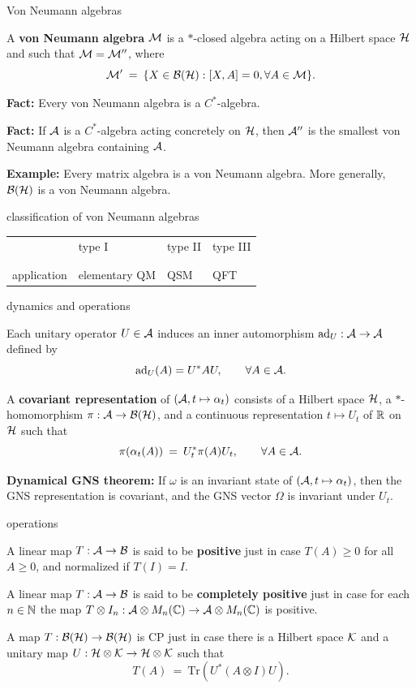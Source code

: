 \documentclass[8pt]{beamer}
\begin{document}
\begin{frame}{Von Neumann algebras}

A \textbf{von Neumann algebra} $\mathcal M$ is a $*$-closed algebra acting on a Hilbert space $\mathcal H$ and such that $\mathcal M = \mathcal M ''$, where 
$$ \mathcal M ' \: = \: \{ X \in \mathcal B (\mathcal H ) : [X,A]=0, \forall A\in \mathcal M \} .$$

\bigskip \textbf{Fact:} Every von Neumann algebra is a $C^*$-algebra.

\bigskip \textbf{Fact:} If $\mathcal A$ is a $C^*$-algebra acting concretely
on $\mathcal H$, then $\mathcal A ''$ is the smallest von Neumann algebra containing
$\mathcal A$.

\bigskip \textbf{Example:} Every matrix algebra is a von Neumann
algebra.  More generally, $\mathcal B (\mathcal H )$ is a von Neumann algebra.
\end{frame}

\begin{frame}{classification of von Neumann algebras}

\begin{tabularx}{\textwidth}{XXXX}
& type I & type II & type III \\ \\ 
\hline \\ 
application & elementary QM & QSM  & QFT
\end{tabularx}

\end{frame}


\begin{frame}{dynamics and operations}

  Each unitary operator $U\in \mathcal A$ induces an inner automorphism
  $\mathrm{ad}_U:\mathcal A\to\mathcal A$ defined by
$$ \mathrm{ad}_U(A) = U^*AU,\qquad \forall A\in \mathcal A .$$

\bigskip A \textbf{covariant representation} of $(\mathcal A ,t\mapsto \alpha
_t)$ consists of a Hilbert space $\mathcal H$, a $*$-homomorphism $\pi:\mathcal A\to\mathcal B (\mathcal H )$, and a continuous representation $t\mapsto U_t$ of $\mathbb R$ on $\mathcal H$ such that 
$$ \pi (\alpha _t(A)) \: =\: U^*_t\pi (A)U_t ,\qquad \forall A\in \mathcal A .$$

\bigskip \textbf{Dynamical GNS theorem:} If $\omega$ is an invariant
state of $(\mathcal A ,t\mapsto \alpha _t)$, then the GNS representation is
covariant, and the GNS vector $\Omega$ is invariant under $U_t$.

\end{frame}
\begin{frame}{operations}

  A linear map $T:\mathcal A\to\mathcal B$ is said to be \textbf{positive} just in
  case $T(A)\geq 0$ for all $A\geq 0$, and normalized if $T(I)=I$.

  \bigskip A linear map $T:\mathcal A\to\mathcal B$ is said to be \textbf{completely
    positive} just in case for each $n\in\mathbb N$ the map
  $T\otimes I_n:\mathcal A\otimes M_n(\mathbb C )\to\mathcal A\otimes M_n(\mathbb C )$ is
  positive.

\bigskip A map $T:\mathcal B (\mathcal H )\to \mathcal B (\mathcal H )$ is CP just in case there is a Hilbert space $\mathcal K$ and a unitary map $U:\mathcal H\otimes \mathcal K\to \mathcal H\otimes\mathcal K$ such that 
$$ T(A) \: = \: \mathrm{Tr}(U^*(A\otimes I)U) .$$

\end{frame}
\end{document}
